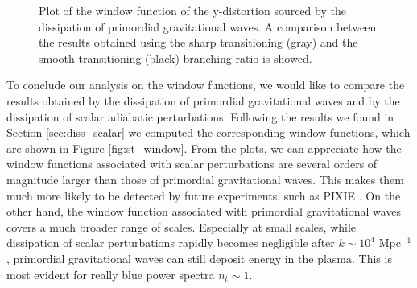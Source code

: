 \begin{figure}
    \centering
{}
\caption{Plot of the window function of the y-distortion sourced by the dissipation of primordial gravitational waves. A comparison between the results obtained using the sharp transitioning (gray) and the smooth transitioning (black) branching ratio is showed.}
\label{fig:y_window}
\end{figure}
To conclude our analysis on the window functions, we would like to compare the results obtained by the dissipation of primordial gravitational waves and by the dissipation of scalar adiabatic perturbations. Following the results we found in Section \ref{sec:diss_scalar} we computed the corresponding window functions, which are shown in Figure \ref{fig:st_window}. From the plots, we can appreciate how the window functions associated with scalar perturbations are several orders of magnitude larger than those of primordial gravitational waves. This makes them much more likely to be detected by future experiments, such as PIXIE \cite{pixie}. On the other hand, the window function associated with primordial gravitational waves covers a much broader range of scales. Especially at small scales, while dissipation of scalar perturbations rapidly becomes negligible after $k\sim10^{4}$ Mpc$^{-1}$, primordial gravitational waves can still deposit energy in the plasma. This is most evident for really blue power spectra $n_t\sim1$.

